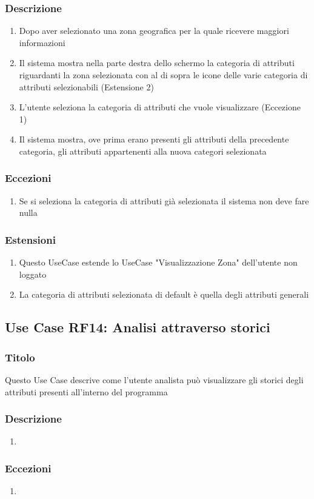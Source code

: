         \subsubsection{Descrizione}
            \begin{enumerate}
                \item Dopo aver selezionato una zona geografica per la quale ricevere maggiori informazioni
                \item Il sistema mostra nella parte destra dello schermo la categoria di attributi riguardanti la zona selezionata con al di sopra le icone delle varie categoria di attributi selezionabili (Estensione 2)
                \item L'utente seleziona la categoria di attributi che vuole visualizzare (Eccezione 1)
                \item Il sistema mostra, ove prima erano presenti gli attributi della precedente categoria, gli attributi appartenenti alla nuova categori selezionata
            \end{enumerate}
        \subsubsection{Eccezioni}
            \begin{enumerate}
                \item Se si seleziona la categoria di attributi già selezionata il sistema non deve fare nulla
            \end{enumerate}
        \subsubsection{Estensioni}
            \begin{enumerate}
                \item Questo UseCase estende lo UseCase "Visualizzazione Zona" dell'utente non loggato
                \item La categoria di attributi selezionata di default è quella degli attributi generali
            \end{enumerate}

    \subsection{Use Case RF14: Analisi attraverso storici}
        \subsubsection{Titolo}
            Questo Use Case descrive come l'utente analista può visualizzare gli storici degli attributi presenti all'interno del programma
        \subsubsection{Descrizione}
            \begin{enumerate}
                \item 
            \end{enumerate}
        \subsubsection{Eccezioni}
            \begin{enumerate}
                \item 
            \end{enumerate}